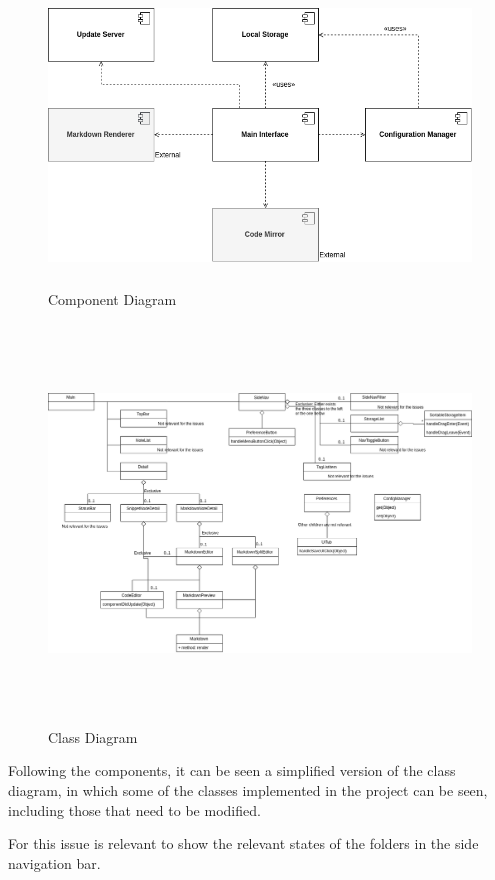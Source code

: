 \begin{figure}
\centering
\includegraphics[height=3.12500in]{../ComponentDiagram.png}
\caption{Component Diagram}
\end{figure}

\begin{figure}
\centering
\includegraphics[height=4.16667in]{../ClassDiagram.png}
\caption{Class Diagram}
\end{figure}

Following the components, it can be seen a simplified version of the
class diagram, in which some of the classes implemented in the project
can be seen, including those that need to be modified.

For this issue is relevant to show the relevant states of the folders in
the side navigation bar.

